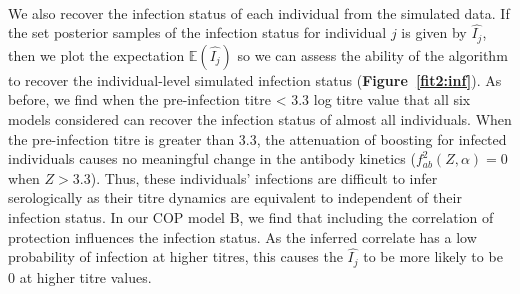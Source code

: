 \paragraph{}We also recover the infection status of each individual from the simulated data. If the set posterior samples of the infection status for individual $j$ is given by $\hat{I_j} $, then we plot the expectation $\mathbb{E}(\hat{I_j} )$ so we can assess the ability of the algorithm to recover the individual-level simulated infection status (\textbf{Figure~\ref{fit2:inf}}). As before, we find when the pre-infection titre < 3.3 log titre value that all six models considered can recover the infection status of almost all individuals. When the pre-infection titre is greater than 3.3, the attenuation of boosting for infected individuals causes no meaningful change in the antibody kinetics ($f^2_{ab}(Z, \alpha) = 0$ when $Z > 3.3$). Thus, these individuals' infections are difficult to infer serologically as their titre dynamics are equivalent to independent of their infection status. In our COP model B, we find that including the correlation of protection influences the infection status. As the inferred correlate has a low probability of infection at higher titres, this causes the $\hat{I_j}$ to be more likely to be 0 at higher titre values. 

